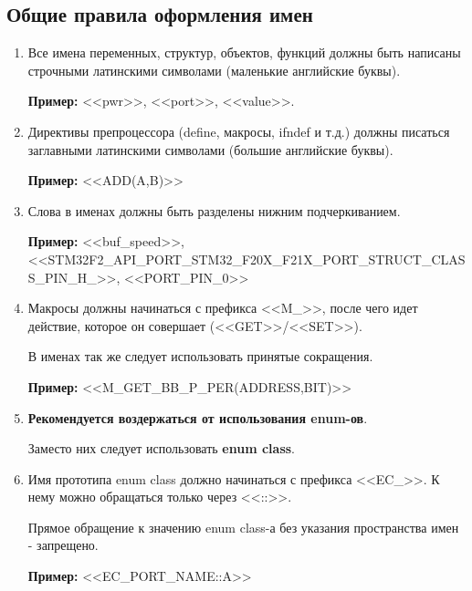 \subsection{Общие правила оформления имен}
\label{general:rules:0}
\begin{enumerate}
	\item Все имена переменных, структур, объектов, функций должны быть написаны строчными латинскими символами (маленькие английские буквы).
	
	\textbf{Пример: }<<pwr>>, <<port>>, <<value>>.
	\item Директивы препроцессора (define, макросы, ifndef и т.д.) должны писаться заглавными латинскими символами (большие английские буквы). 
	
	\textbf{Пример: }<<ADD(A,B)>>
	\item Слова в именах должны быть разделены нижним подчеркиванием.
	
	\textbf{Пример: }<<buf\_speed>>, <<STM32F2\_\-API\_\-PORT\_\-STM32\_\-F20X\_\-F21X\_\-PORT\_\-STRUCT\_\-CLASS\_\-PIN\_\-H\_>>, <<PORT\_PIN\_0>>
	\item Макросы должны начинаться с префикса <<M\_>>, после чего идет действие, которое он совершает (<<GET>>/<<SET>>).
	
	В именах так же следует использовать принятые сокращения.
	
	\textbf{Пример: }<<M\_GET\_BB\_P\_PER(ADDRESS,BIT)>>
	\item \textbf{Рекомендуется воздержаться от использования enum-ов}.
	
	Заместо них следует использовать \textbf{enum class}.
	\item Имя прототипа enum class должно начинаться с префикса <<EC\_>>. К нему можно обращаться только через <<::>>.
	
	Прямое обращение к значению enum class-а без указания пространства имен - запрещено.
	
	\textbf{Пример: }<<EC\_PORT\_NAME::A>>
\end{enumerate}
